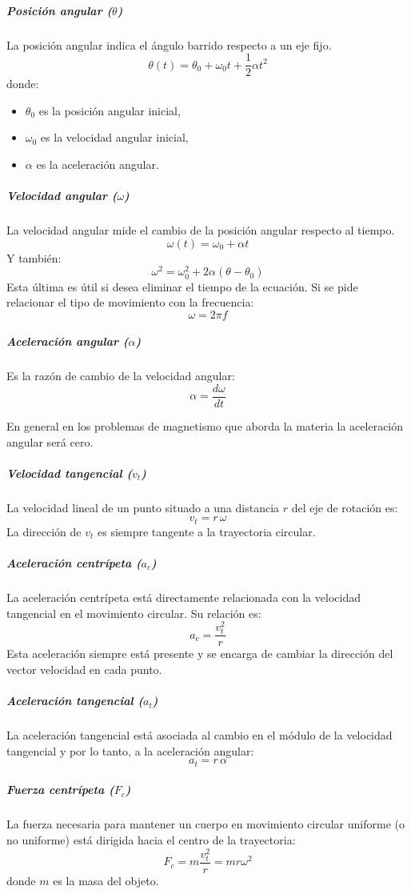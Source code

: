 \subparagraph{Posición angular (\(\theta\))}

La posición angular indica el ángulo barrido respecto a un eje fijo.
\[
\theta(t) = \theta_0 + \omega_0 t + \frac{1}{2} \alpha t^2
\]
donde:
\begin{itemize}
  \item \(\theta_0\) es la posición angular inicial,
  \item \(\omega_0\) es la velocidad angular inicial,
  \item \(\alpha\) es la aceleración angular.
\end{itemize}

\subparagraph{Velocidad angular (\(\omega\))}

La velocidad angular mide el cambio de la posición angular respecto al tiempo.
\[
\omega(t) = \omega_0 + \alpha t
\]
Y también:
\[
\omega^2 = \omega_0^2 + 2\alpha(\theta - \theta_0)
\]
Esta última es útil si desea eliminar el tiempo de la ecuación. Si se pide relacionar el tipo de movimiento con la frecuencia:
\[
  \omega = 2 \pi f
\]

\subparagraph{Aceleración angular (\(\alpha\))}  

Es la razón de cambio de la velocidad angular:
\[
\alpha = \frac{d\omega}{dt}
\]

En general en los problemas de magnetismo que aborda la materia la aceleración angular será cero.

\subparagraph{Velocidad tangencial (\(v_t\))}  

La velocidad lineal de un punto situado a una distancia \( r \) del eje de rotación es:
\[
v_t = r \, \omega
\]
La dirección de \( v_t \) es siempre tangente a la trayectoria circular.

\subparagraph{Aceleración centrípeta (\(a_c\))}

La aceleración centrípeta está directamente relacionada con la velocidad tangencial en el movimiento circular. Su relación es:
\[
a_c = \frac{v_t^2}{r}
\]
Esta aceleración siempre está presente y se encarga de cambiar la dirección del vector velocidad en cada punto.

\subparagraph{Aceleración tangencial (\(a_t\))}  

La aceleración tangencial está asociada al cambio en el módulo de la velocidad tangencial y por lo tanto, a la aceleración angular:
\[
a_t = r \, \alpha
\]

\subparagraph{Fuerza centrípeta (\(F_c\))}

La fuerza necesaria para mantener un cuerpo en movimiento circular uniforme (o no uniforme) está dirigida hacia el centro de la trayectoria:
\[
F_c = m \frac{v_t^2}{r} = m r \omega^2
\]
donde \( m \) es la masa del objeto.

